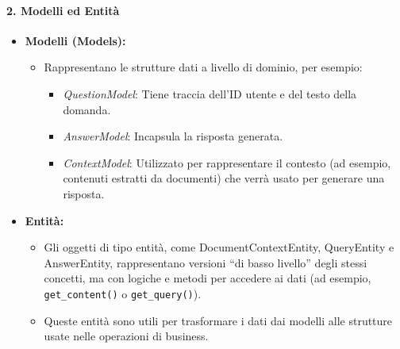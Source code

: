     \paragraph{2. Modelli ed Entità}
    \begin{itemize}
        \item \textbf{Modelli (Models):}
        \begin{itemize}
            \item Rappresentano le strutture dati a livello di dominio, per esempio:
            \begin{itemize}
                \item \textit{QuestionModel}: Tiene traccia dell’ID utente e del testo della domanda.
                \item \textit{AnswerModel}: Incapsula la risposta generata.
                \item \textit{ContextModel}: Utilizzato per rappresentare il contesto (ad esempio, contenuti estratti da documenti) che verrà usato per generare una risposta.
            \end{itemize}
        \end{itemize}
        \item \textbf{Entità:}
        \begin{itemize}
            \item Gli oggetti di tipo entità, come DocumentContextEntity, QueryEntity e AnswerEntity, rappresentano versioni “di basso livello” degli stessi concetti, ma con logiche e metodi per accedere ai dati (ad esempio, \texttt{get\_content()} o \texttt{get\_query()}).
            \item Queste entità sono utili per trasformare i dati dai modelli alle strutture usate nelle operazioni di business.
        \end{itemize}
    \end{itemize}

